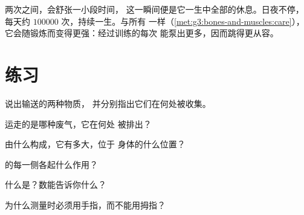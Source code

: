\begin{remark}[一块几乎从不休息的肌肉]\label{rem:g4:heart-and-blood:rest}
两次之间，会舒张一小段时间，
这一瞬间便是它一生中全部的休息。日夜不停，
每天约 $100000$ 次，持续一生。与所有
一样（\cref{met:g3:bones-and-muscles:care}），
它会随锻炼而变得更强：经过训练的每次
能泵出更多，因而跳得更从容。
\end{remark}

\section{练习}

\begin{exercise}[$\star$]\label{exo:g4:heart-and-blood:1}
说出输送的两种物质，
并分别指出它们在何处被收集。
\end{exercise}

\begin{exercise}[$\star$]\label{exo:g4:heart-and-blood:2}
运走的是哪种废气，它在何处
被排出？
\end{exercise}

\begin{exercise}[$\star$]\label{exo:g4:heart-and-blood:3}
由什么构成，它有多大，位于
身体的什么位置？
\end{exercise}

\begin{exercise}[$\star$]\label{exo:g4:heart-and-blood:4}
的每一侧各起什么作用？
\end{exercise}

\begin{exercise}[$\star$]\label{exo:g4:heart-and-blood:5}
什么是？数能告诉你什么？
\end{exercise}

\begin{exercise}[$\star$]\label{exo:g4:heart-and-blood:6}
为什么测量时必须用手指，而不能用拇指？
\end{exercise}

